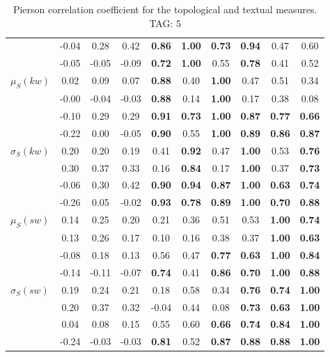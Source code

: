 \begin{table*}[h!]
\begin{center}
\begin{tabular}{| l || c | c | c | c | c | c | c | c | c |}
 & -0.04 & 0.28 & 0.42 & {\bf 0.86} & {\bf 1.00} & {\bf 0.73} & {\bf 0.94} & 0.47 & 0.60 \\
 & -0.05 & -0.05 & -0.09 & {\bf 0.72} & {\bf 1.00} & 0.55 & {\bf 0.78} & 0.41 & 0.52 \\\hline
$\mu_S(kw)$ & 0.02 & 0.09 & 0.07 & {\bf 0.88} & 0.40 & {\bf 1.00} & 0.47 & 0.51 & 0.34 \\
 & -0.00 & -0.04 & -0.03 & {\bf 0.88} & 0.14 & {\bf 1.00} & 0.17 & 0.38 & 0.08 \\
 & -0.10 & 0.29 & 0.29 & {\bf 0.91} & {\bf 0.73} & {\bf 1.00} & {\bf 0.87} & {\bf 0.77} & {\bf 0.66} \\
 & -0.22 & 0.00 & -0.05 & {\bf 0.90} & 0.55 & {\bf 1.00} & {\bf 0.89} & {\bf 0.86} & {\bf 0.87} \\\hline
$\sigma_S(kw)$ & 0.20 & 0.20 & 0.19 & 0.41 & {\bf 0.92} & 0.47 & {\bf 1.00} & 0.53 & {\bf 0.76} \\
 & 0.30 & 0.37 & 0.33 & 0.16 & {\bf 0.84} & 0.17 & {\bf 1.00} & 0.37 & {\bf 0.73} \\
 & -0.06 & 0.30 & 0.42 & {\bf 0.90} & {\bf 0.94} & {\bf 0.87} & {\bf 1.00} & {\bf 0.63} & {\bf 0.74} \\
 & -0.26 & 0.05 & -0.02 & {\bf 0.93} & {\bf 0.78} & {\bf 0.89} & {\bf 1.00} & {\bf 0.70} & {\bf 0.88} \\\hline
$\mu_S(sw)$ & 0.14 & 0.25 & 0.20 & 0.21 & 0.36 & 0.51 & 0.53 & {\bf 1.00} & {\bf 0.74} \\
 & 0.13 & 0.26 & 0.17 & 0.10 & 0.16 & 0.38 & 0.37 & {\bf 1.00} & {\bf 0.63} \\
 & -0.08 & 0.18 & 0.13 & 0.56 & 0.47 & {\bf 0.77} & {\bf 0.63} & {\bf 1.00} & {\bf 0.84} \\
 & -0.14 & -0.11 & -0.07 & {\bf 0.74} & 0.41 & {\bf 0.86} & {\bf 0.70} & {\bf 1.00} & {\bf 0.88} \\\hline
$\sigma_S(sw)$ & 0.19 & 0.24 & 0.21 & 0.18 & 0.58 & 0.34 & {\bf 0.76} & {\bf 0.74} & {\bf 1.00} \\
 & 0.20 & 0.37 & 0.32 & -0.04 & 0.44 & 0.08 & {\bf 0.73} & {\bf 0.63} & {\bf 1.00} \\
 & 0.04 & 0.08 & 0.15 & 0.55 & 0.60 & {\bf 0.66} & {\bf 0.74} & {\bf 0.84} & {\bf 1.00} \\
 & -0.24 & -0.03 & -0.03 & {\bf 0.81} & 0.52 & {\bf 0.87} & {\bf 0.88} & {\bf 0.88} & {\bf 1.00} \\\hline
\end{tabular}
\caption{Pierson correlation coefficient for the topological and textual measures. TAG: 5}
\end{center}
\end{table*}